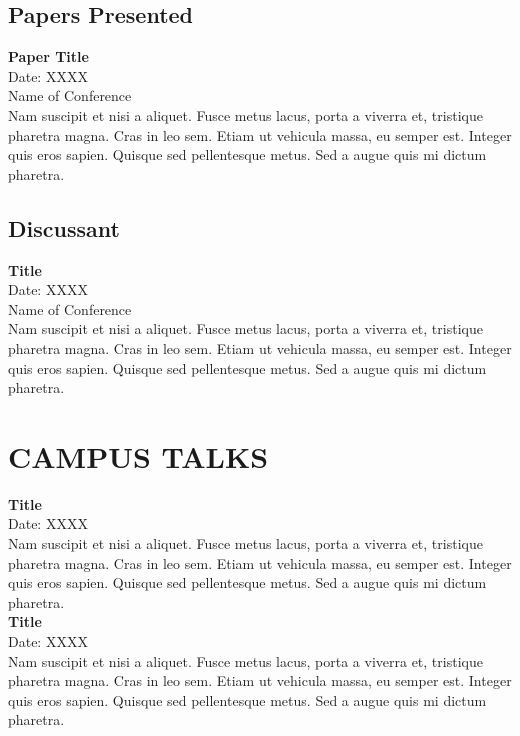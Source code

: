 \documentclass[a4paper,9pt]{extarticle}
\begin{document}
\subsection*{Papers Presented}
\textbf{Paper Title} \\
Date: XXXX \\
Name of Conference \\
Nam suscipit et nisi a aliquet. Fusce metus lacus, porta a viverra et, tristique pharetra magna. Cras in leo sem. Etiam ut vehicula massa, eu semper est. Integer quis eros sapien. Quisque sed pellentesque metus. Sed a augue quis mi dictum pharetra.

\subsection*{Discussant}
\textbf{Title} \\
Date: XXXX \\
Name of Conference \\
Nam suscipit et nisi a aliquet. Fusce metus lacus, porta a viverra et, tristique pharetra magna. Cras in leo sem. Etiam ut vehicula massa, eu semper est. Integer quis eros sapien. Quisque sed pellentesque metus. Sed a augue quis mi dictum pharetra. 


\section*{CAMPUS TALKS}

\noindent
\newline
\textbf{Title} \\
Date: XXXX \\
Nam suscipit et nisi a aliquet. Fusce metus lacus, porta a viverra et, tristique pharetra magna. Cras in leo sem. Etiam ut vehicula massa, eu semper est. Integer quis eros sapien. Quisque sed pellentesque metus. Sed a augue quis mi dictum pharetra. \\

\noindent
\textbf{Title} \\
Date: XXXX \\
Nam suscipit et nisi a aliquet. Fusce metus lacus, porta a viverra et, tristique pharetra magna. Cras in leo sem. Etiam ut vehicula massa, eu semper est. Integer quis eros sapien. Quisque sed pellentesque metus. Sed a augue quis mi dictum pharetra. \\
\end{document}

